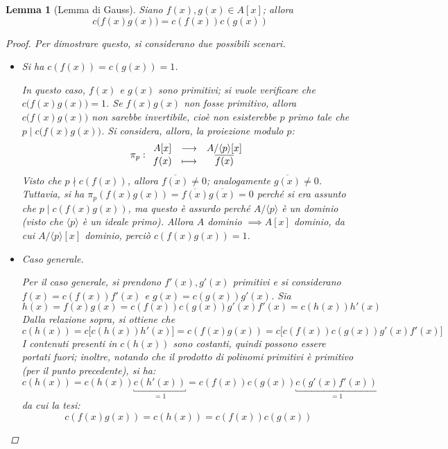 \documentclass[12pt]{scrartcl}
\theoremstyle{style}
\newtheorem{lemma}{Lemma}[teorema]
\numberwithin{equation}{subsection}
\begin{document}
\begin{lemma}
	[Lemma di Gauss]
	Siano $f(x), g(x) \in A[x]$; allora
	\[
		c\big(f(x)g(x)\big) = c(f(x)) c(g(x))
	\] 
	\begin{proof}
		Per dimostrare questo, si considerano due possibili scenari.
		\begin{itemize}
			\item Si ha $c(f(x))=c(g(x)) = 1$.

				In questo caso, $f(x) $ e $g(x)$ sono primitivi; si vuole verificare che $c\big(f(x) g(x)\big) = 1$.
				Se $f(x) g(x)$ non fosse primitivo, allora $c\big(f(x)g(x)\big)$ non sarebbe invertibile, cio\`e non esisterebbe $p$ primo tale che $p  \mid c\big(f(x)g(x)\big)$.
				Si considera, allora, la proiezione modulo $p$:
				\[
				\pi_{p} :
				\begin{array}
					{c c c}
					A[x] &\longrightarrow & A / \langle p \rangle [x] \\
					f(x) &\longmapsto & \overline{f(x)}
				\end{array}
				\] 
				Visto che $p \nmid c(f(x))$, allora $\overline{f(x)}\neq 0$; analogamente $\overline{g(x)}\neq 0$.
				Tuttavia, si ha $\pi_p (f(x)g(x)) = \overline{f(x)}\overline{g(x)} = 0$ perch\'e si era assunto che $p \mid c(f(x)g(x))$, ma questo \`e assurdo perch\'e $A / \langle p \rangle$ \`e un dominio (visto che $\langle p \rangle$ \`e un ideale primo).
				Allora $A$ dominio $\implies A[x]$ dominio, da cui $A / \langle p \rangle [x]$ dominio, perci\`o $c(f(x)g(x)) = 1$.
			\item Caso generale.
				
				Per il caso generale, si prendono $f'(x),g'(x)$ primitivi e si considerano $f(x) = c(f(x)) f'(x)$ e $g(x) = c(g(x)) g'(x)$.
				Sia
				\[
				h(x) = f(x)g(x) = c(f(x)) c(g(x)) g'(x) f'(x)=c(h(x)) h'(x)
				\] 
Dalla relazione sopra, si ottiene che
\[
	c(h(x))=c\big[c(h(x)) h'(x)\big]= c(f(x)g(x))=c\big[c(f(x)) c(g(x)) g'(x) f'(x)\big]
\] 
I contenuti presenti in $c(h(x))$ sono costanti, quindi possono essere portati fuori; inoltre, notando che il prodotto di polinomi primitivi \`e primitivo (per il punto precedente), si ha:
\[
	c(h(x)) = c(h(x)) \underbracket{c(h'(x))}_{=1} =c(f(x))c(g(x)) \underbracket{c(g'(x)f'(x))}_{=1} 
\] 
 da cui la tesi:
 \[
 c(f(x)g(x)) = c(h(x)) = c(f(x))c(g(x))
 \] 
		\end{itemize}
	\end{proof}
\end{lemma}
\end{document}
